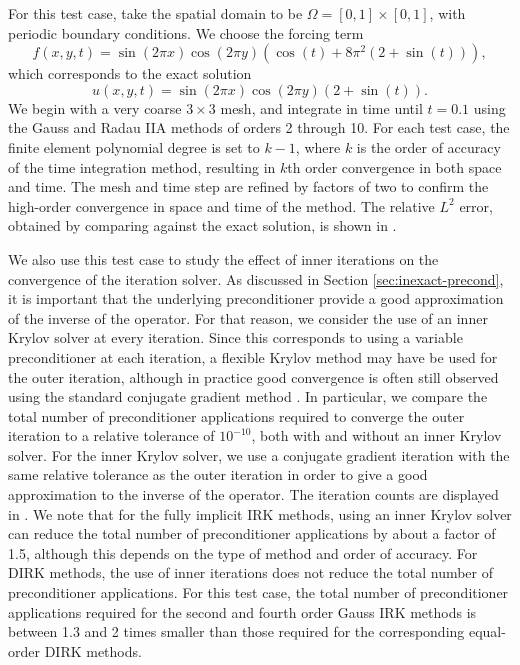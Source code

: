 \documentclass[review]{siamart}
\begin{document}
For this test case, take the spatial domain to be $\Omega = [0,1] \times [0,1]$, with periodic boundary conditions.
We choose the forcing term
\[
	f(x, y, t) = \sin (2\pi x)\cos(2\pi y) \left(\cos(t) + 8 \pi^2 (2 + \sin(t)) \right),
\]
which corresponds to the exact solution
\[
	u(x, y, t) = \sin(2\pi x)\cos(2\pi y)(2 + \sin(t)).
\]
We begin with a very coarse $3 \times 3$ mesh, and integrate in time until $t=0.1$ using the Gauss and Radau IIA methods of orders 2 through 10.
For each test case, the finite element polynomial degree is set to $k-1$, where $k$ is the order of accuracy of the time integration method, resulting in $k$th order convergence in both space and time.
The mesh and time step are refined by factors of two to confirm the high-order convergence in space and time of the method.
The relative $L^2$ error, obtained by comparing against the exact solution, is shown in .

We also use this test case to study the effect of inner iterations on the convergence of the iteration solver.
As discussed in Section \ref{sec:inexact-precond}, it is important that the underlying preconditioner provide a good approximation of the inverse of the operator.
For that reason, we consider the use of an inner Krylov solver at every iteration.
Since this corresponds to using a variable preconditioner at each iteration, a flexible Krylov method may have be used for the outer iteration, although in practice good convergence is often still observed using the standard conjugate gradient method \cite{Notay2000}.
In particular, we compare the total number of preconditioner applications required to converge the outer iteration to a relative tolerance of $10^{-10}$, both with and without an inner Krylov solver.
For the inner Krylov solver, we use a conjugate gradient iteration with the same relative tolerance as the outer iteration in order to give a good approximation to the inverse of the operator.
The iteration counts are displayed in .
We note that for the fully implicit IRK methods, using an inner Krylov solver can reduce the total number of preconditioner applications by about a factor of 1.5, although this depends on the type of method and order of accuracy.
For DIRK methods, the use of inner iterations does not reduce the total number of preconditioner applications.
For this test case, the total number of preconditioner applications required for the second and fourth order Gauss IRK methods is between 1.3 and 2 times smaller than those required for the corresponding equal-order DIRK methods.
\end{document}
